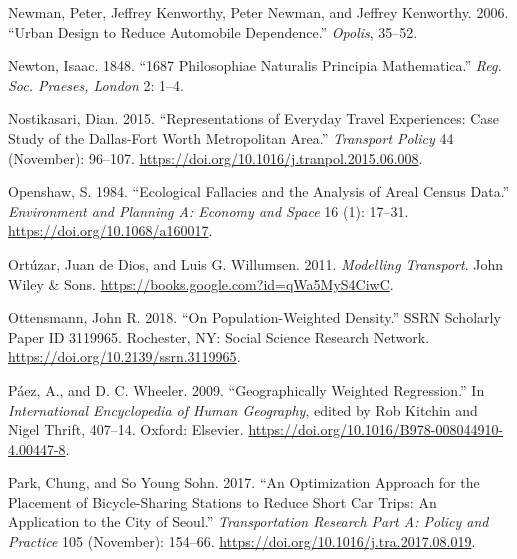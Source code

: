 \documentclass[
  12pt,
]{article}
\newlength{\cslhangindent}
\newlength{\cslentryspacingunit} %
\newenvironment{CSLReferences}[2] %
 {%
  \setlength{\parindent}{0pt}
  \ifodd #1
  \let\oldpar\par
  \def\par{\hangindent=\cslhangindent\oldpar}
  \fi
  \setlength{\parskip}{#2\cslentryspacingunit}
 }%
 {}
\begin{document}
\begin{CSLReferences}{1}{0}
\leavevmode{}%
Newman, Peter, Jeffrey Kenworthy, Peter Newman, and Jeffrey Kenworthy. 2006. {``Urban Design to Reduce Automobile Dependence.''} \emph{Opolis}, 35--52.

\leavevmode{}%
Newton, Isaac. 1848. {``1687 Philosophiae Naturalis Principia Mathematica.''} \emph{Reg. Soc. Praeses, London} 2: 1--4.

\leavevmode{}%
Nostikasari, Dian. 2015. {``Representations of Everyday Travel Experiences: {Case} Study of the {Dallas-Fort Worth Metropolitan Area}.''} \emph{Transport Policy} 44 (November): 96--107. \url{https://doi.org/10.1016/j.tranpol.2015.06.008}.

\leavevmode{}%
Openshaw, S. 1984. {``Ecological {Fallacies} and the {Analysis} of {Areal Census Data}.''} \emph{Environment and Planning A: Economy and Space} 16 (1): 17--31. \url{https://doi.org/10.1068/a160017}.

\leavevmode{}%
Ortúzar, Juan de Dios, and Luis G. Willumsen. 2011. \emph{Modelling {Transport}}. {John Wiley \& Sons}. \url{https://books.google.com?id=qWa5MyS4CiwC}.

\leavevmode{}%
Ottensmann, John R. 2018. {``On {Population-Weighted Density}.''} SSRN Scholarly Paper ID 3119965. {Rochester, NY}: {Social Science Research Network}. \url{https://doi.org/10.2139/ssrn.3119965}.

\leavevmode{}%
Páez, A., and D. C. Wheeler. 2009. {``Geographically {Weighted Regression}.''} In \emph{International {Encyclopedia} of {Human Geography}}, edited by Rob Kitchin and Nigel Thrift, 407--14. {Oxford}: {Elsevier}. \url{https://doi.org/10.1016/B978-008044910-4.00447-8}.

\leavevmode{}%
Park, Chung, and So Young Sohn. 2017. {``An Optimization Approach for the Placement of Bicycle-Sharing Stations to Reduce Short Car Trips: {An} Application to the City of {Seoul}.''} \emph{Transportation Research Part A: Policy and Practice} 105 (November): 154--66. \url{https://doi.org/10.1016/j.tra.2017.08.019}.


\end{CSLReferences}
\end{document}
